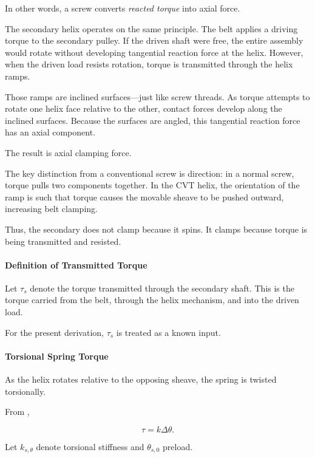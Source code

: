 \documentclass[11pt]{article}
\numberwithin{equation}{section}
\newcounter{theory}
\begin{document}
In other words, a screw converts \emph{reacted torque} into axial force.

The secondary helix operates on the same principle.
The belt applies a driving torque to the secondary pulley.
If the driven shaft were free, the entire assembly would rotate
without developing tangential reaction force at the helix.
However, when the driven load resists rotation,
torque is transmitted through the helix ramps.

Those ramps are inclined surfaces—just like screw threads.
As torque attempts to rotate one helix face relative to the other,
contact forces develop along the inclined surfaces.
Because the surfaces are angled, this tangential reaction force
has an axial component.

The result is axial clamping force.

The key distinction from a conventional screw is direction:
in a normal screw, torque pulls two components together.
In the CVT helix, the orientation of the ramp is such that
torque causes the movable sheave to be pushed outward,
increasing belt clamping.

Thus, the secondary does not clamp because it spins.
It clamps because torque is being transmitted and resisted.

\paragraph{Definition of Transmitted Torque}

Let $\tau_s$ denote the torque transmitted through the secondary shaft.
This is the torque carried from the belt, through the helix mechanism,
and into the driven load.

For the present derivation, $\tau_s$ is treated as a known input.

\paragraph{Torsional Spring Torque}

As the helix rotates relative to the opposing sheave,
the spring is twisted torsionally.

From ,

\[
\tau = k \Delta \theta.
\]

Let $k_{s,\theta}$ denote torsional stiffness and $\theta_{s,0}$ preload.
\end{document}
